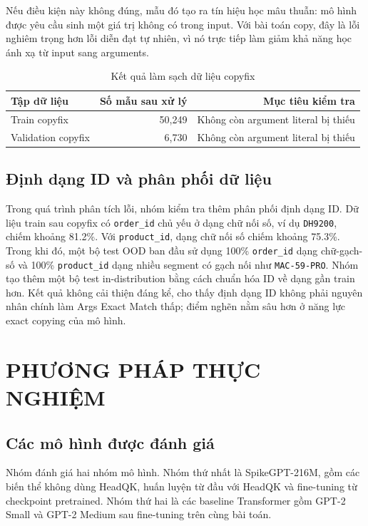 \documentclass[12pt,a4paper,oneside]{report}
\newlength{\manualparindent}
\newcommand{\manualindent}{\hspace*{\manualparindent}}
\begin{document}
\manualindent%
Nếu điều kiện này không đúng, mẫu đó tạo ra tín hiệu học mâu thuẫn: mô hình được yêu cầu sinh một giá trị không có trong input. Với bài toán copy, đây là lỗi nghiêm trọng hơn lỗi diễn đạt tự nhiên, vì nó trực tiếp làm giảm khả năng học ánh xạ từ input sang arguments.

\begin{table}[H]
\centering
\caption{Kết quả làm sạch dữ liệu copyfix}
\begin{tabular}{lrr}
\toprule
\textbf{Tập dữ liệu} & \textbf{Số mẫu sau xử lý} & \textbf{Mục tiêu kiểm tra} \\
\midrule
Train copyfix & 50,249 & Không còn argument literal bị thiếu \\
Validation copyfix & 6,730 & Không còn argument literal bị thiếu \\
\bottomrule
\end{tabular}
\end{table}

\section{Định dạng ID và phân phối dữ liệu}

\manualindent%
Trong quá trình phân tích lỗi, nhóm kiểm tra thêm phân phối định dạng ID. Dữ liệu train sau copyfix có \texttt{order\_id} chủ yếu ở dạng chữ nối số, ví dụ \texttt{DH9200}, chiếm khoảng 81.2\%. Với \texttt{product\_id}, dạng chữ nối số chiếm khoảng 75.3\%. Trong khi đó, một bộ test OOD ban đầu sử dụng 100\% \texttt{order\_id} dạng chữ-gạch-số và 100\% \texttt{product\_id} dạng nhiều segment có gạch nối như \texttt{MAC-59-PRO}. Nhóm tạo thêm một bộ test in-distribution bằng cách chuẩn hóa ID về dạng gần train hơn. Kết quả không cải thiện đáng kể, cho thấy định dạng ID không phải nguyên nhân chính làm Args Exact Match thấp; điểm nghẽn nằm sâu hơn ở năng lực exact copying của mô hình.

\chapter{PHƯƠNG PHÁP THỰC NGHIỆM}

\section{Các mô hình được đánh giá}

\manualindent%
Nhóm đánh giá hai nhóm mô hình. Nhóm thứ nhất là SpikeGPT-216M, gồm các biến thể không dùng HeadQK, huấn luyện từ đầu với HeadQK và fine-tuning từ checkpoint pretrained. Nhóm thứ hai là các baseline Transformer gồm GPT-2 Small và GPT-2 Medium sau fine-tuning trên cùng bài toán.
\end{document}
